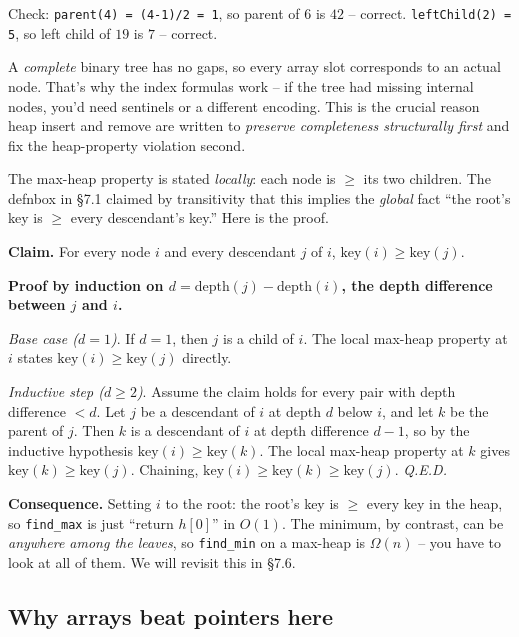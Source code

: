 \documentclass[11pt]{article}
\begin{document}
Check: \texttt{parent(4) = (4-1)/2 = 1}, so parent of $6$ is $42$ -- correct. \texttt{leftChild(2) = 5}, so left child of $19$ is $7$ -- correct.

\begin{ideabox}
A \emph{complete} binary tree has no gaps, so every array slot corresponds to an actual node. That's why the index formulas work -- if the tree had missing internal nodes, you'd need sentinels or a different encoding. This is the crucial reason heap insert and remove are written to \emph{preserve completeness structurally first} and fix the heap-property violation second.
\end{ideabox}

\begin{examplebox}
The max-heap property is stated \emph{locally}: each node is $\ge$ its
two children. The defnbox in \S7.1 claimed by transitivity that this
implies the \emph{global} fact ``the root's key is $\ge$ every
descendant's key.'' Here is the proof.

\textbf{Claim.} For every node $i$ and every descendant $j$ of $i$,
$\text{key}(i) \ge \text{key}(j)$.

\textbf{Proof by induction on $d = \text{depth}(j) - \text{depth}(i)$,
the depth difference between $j$ and $i$.}

\textit{Base case ($d = 1$)}. If $d = 1$, then $j$ is a child of $i$.
The local max-heap property at $i$ states $\text{key}(i) \ge
\text{key}(j)$ directly.

\textit{Inductive step ($d \ge 2$)}. Assume the claim holds for every
pair with depth difference $< d$. Let $j$ be a descendant of $i$ at
depth $d$ below $i$, and let $k$ be the parent of $j$. Then $k$ is a
descendant of $i$ at depth difference $d - 1$, so by the inductive
hypothesis $\text{key}(i) \ge \text{key}(k)$. The local max-heap
property at $k$ gives $\text{key}(k) \ge \text{key}(j)$. Chaining,
$\text{key}(i) \ge \text{key}(k) \ge \text{key}(j)$. \emph{Q.E.D.}

\textbf{Consequence.} Setting $i$ to the root: the root's key is $\ge$
every key in the heap, so \texttt{find\_max} is just ``return $h[0]$''
in $O(1)$. The minimum, by contrast, can be \emph{anywhere among the
leaves}, so \texttt{find\_min} on a max-heap is $\Omega(n)$ -- you have
to look at all of them. We will revisit this in \S7.6.
\end{examplebox}

\subsection*{Why arrays beat pointers here}
\end{document}
